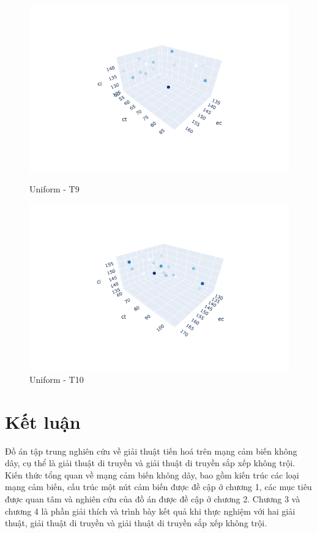 \documentclass{hust}
\begin{document}
\begin{itemize}
	\begin{figure}[H]
		\begin{minipage}{0.5\textwidth}
			\centering
			\includegraphics[width=1.2\linewidth]{images/uu-dem9.png}
			\caption{Uniform - T9}\label{fig:nsga-ii-uu-dem9}
		\end{minipage}\hfill
		\begin{minipage}{0.5\textwidth}
			\centering
			\includegraphics[width=1.2\linewidth]{images/uu-dem10.png}
			\caption{Uniform - T10}\label{fig:nsga-ii-uu-dem10}
		\end{minipage}
	\end{figure}
\end{itemize}

\chapter*{Kết luận}
Đồ án tập trung nghiên cứu về giải thuật tiến hoá trên mạng cảm biến không dây, cụ thể là giải thuật di truyền và giải thuật di truyền sắp xếp không trội. Kiến thức tổng quan về mạng cảm biến không dây, bao gồm kiến trúc các loại mạng cảm biến, cấu trúc một nút cảm biến được đề cập ở chương 1, các mục tiêu được quan tâm và nghiên cứu của đồ án được đề cập ở chương 2. Chương 3 và chương 4 là phần giải thích và trình bày kết quả khi thực nghiệm với hai giải thuật, giải thuật di truyền và giải thuật di truyền sắp xếp không trội.
\end{document}
